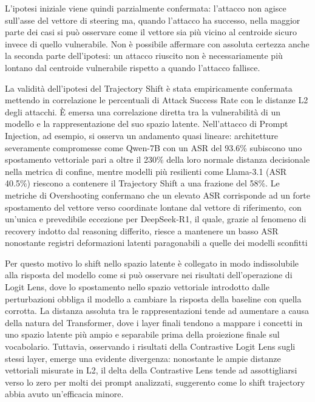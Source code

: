 L'ipotesi iniziale viene quindi parzialmente confermata: l'attacco non agisce sull'asse del vettore di steering ma, quando l'attacco ha successo, nella maggior parte dei casi si può osservare come il vettore sia più vicino al centroide sicuro invece di quello vulnerabile.
Non è possibile affermare con assoluta certezza anche la seconda parte dell'ipotesi: un attacco riuscito non è necessariamente più lontano dal centroide vulnerabile rispetto a quando l'attacco fallisce. 

La validità dell'ipotesi del Trajectory Shift è stata empiricamente confermata mettendo in correlazione le percentuali di Attack Success Rate con le distanze L2 degli attacchi. È emersa una correlazione diretta tra la vulnerabilità di un modello e la rappresentazione del suo spazio latente. Nell'attacco di Prompt Injection, ad esempio, si osserva un andamento quasi lineare: architetture severamente compromesse come Qwen-7B con un ASR del 93.6\% subiscono uno spostamento vettoriale pari a oltre il 230\% della loro normale distanza decisionale nella metrica di confine, mentre modelli più resilienti come Llama-3.1 (ASR 40.5\%) riescono a contenere il Trajectory Shift a una frazione del 58\%.
Le metriche di Overshooting confermano che un elevato ASR corrisponde ad un forte spostamento del vettore verso coordinate lontane dal vettore di riferimento, con un'unica e prevedibile eccezione per DeepSeek-R1, il quale, grazie al fenomeno di recovery indotto dal reasoning differito, riesce a mantenere un basso ASR nonostante registri deformazioni latenti paragonabili a quelle dei modelli sconfitti

Per questo motivo lo shift nello spazio latente è collegato in modo indissolubile alla risposta del modello come si può osservare nei risultati dell'operazione di Logit Lens, dove lo spostamento nello spazio vettoriale introdotto dalle perturbazioni obbliga il modello a cambiare la risposta della baseline con quella corrotta.
La distanza assoluta tra le rappresentazioni tende ad aumentare a causa della natura del Transformer, dove i layer finali tendono a mappare i concetti in uno spazio latente più ampio e separabile prima della proiezione finale sul vocabolario.
Tuttavia, osservando i risultati della Contrastive Logit Lens sugli stessi layer, emerge una evidente divergenza: nonostante le ampie distanze vettoriali misurate in L2, il delta della Contrastive Lens tende ad assottigliarsi verso lo zero per molti dei prompt analizzati, suggerento come lo shift trajectory abbia avuto un'efficacia minore.

